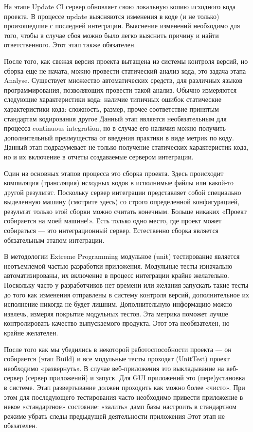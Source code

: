 \documentclass{../industrial-development}
\begin{document}
На этапе Update CI сервер обновляет свою локальную копию исходного кода проекта. В процессе update выясняются изменения в коде (и не только) произошедшие с последней интеграции. Выяснение изменений необходимо для того, чтобы в случае сбоя можно было легко выяснить причину и найти ответственного. Этот этап также обязателен.

После того, как свежая версия проекта вытащена из системы контроля версий, но сборка еще не начата, можно провести статический анализ кода, это задача этапа Analyse. Существует множество автоматических средств, для различных языков программирования, позволяющих провести такой анализ. Обычно измеряются следующие характеристики кода:
	наличие типичных ошибок
	статические характеристики кода: сложность, размер, прочее
	соответствие принятым стандартам кодирования
	другое
Данный этап является необязательным для процесса continuous integration, но в случае его наличия можно получить дополнительный преимущества от введения практики в виде метрик по коду. Данный этап подразумевает не только получение статических характеристик кода, но и их включение в отчеты создаваемые сервером интеграции.

Один из основных этапов процесса это сборка проекта. Здесь происходит компиляция (трансляция) исходных кодов в исполнимые файлы или какой-то другой результат. Поскольку сервер интеграции представляет собой специально выделенную машину (смотрите здесь) со строго определенной конфигурацией, результат только этой сборки можно считать конечным. Больше никаких «Проект собирается на моей машине!». Есть только одно место, где проект может собираться — это интеграционный сервер.
Естественно сборка является обязательным этапом интеграции.

В методологии Extreme Programming модульное (unit) тестирование является неотъемлемой частью разработки приложения. Модульные тесты изначально автоматизированы, их включение в процесс интеграции крайне желательно. Поскольку часто у разработчиков нет времени или желания запускать такие тесты до того как изменения отправлены в систему контроля версий, дополнительное их исполнение никогда не будет лишним. Дополнительную информацию можно извлечь, измеряя покрытие модульных тестов. Эта метрика поможет лучше контролировать качество выпускаемого продукта. Этот эта необязателен, но крайне желателен.

После того как мы убедились в некоторой работоспособности проекта — он собирается (этап Build) и все модульные тесты проходят (UnitTest) проект необходимо «развернуть». В случае веб-приложения это выкладывание на веб-сервер (сервер приложений) и запуск. Для GUI приложений это (пере)установка в системе.
Этап развертывание должен проходить как можно более «чисто». При этом для последующего тестирования часто необходимо привести приложение в некое «стандартное» состояние:
	«залить» дамп базы
	настроить в стандартном режиме
	убрать следы предыдущей деятельности приложения
Этот этап не обязателен.
\end{document}
